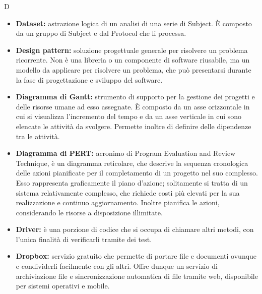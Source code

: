 \Huge D
\normalsize
\begin{itemize}
\item\textbf{Dataset:} astrazione logica di un analisi di una serie di Subject\glossario{}. È composto da un gruppo di Subject\glossario{} e dal Protocol\glossario{} che li processa.

\item \textbf{Design pattern:} soluzione progettuale generale per risolvere un problema ricorrente. Non è una libreria o un componente di software riusabile, ma un modello da applicare per risolvere un problema, che può presentarsi durante la fase di progettazione e sviluppo del software.

\item\textbf{Diagramma di Gantt:} strumento di supporto per la gestione dei progetti e delle risorse umane ad esso assegnate. \`E composto da un asse orizzontale in cui si visualizza l'incremento del tempo e da un asse verticale in cui sono elencate le attività da svolgere. Permette inoltre di definire delle dipendenze tra le attività.

\item \textbf{Diagramma di PERT:} acronimo di Program Evaluation and Review Technique, è un diagramma reticolare, che descrive la sequenza cronologica delle azioni pianificate per il completamento di un progetto nel suo complesso. Esso rappresenta graficamente il piano d’azione; solitamente si tratta di un sistema relativamente complesso, che richiede costi più elevati per la sua realizzazione e continuo aggiornamento. Inoltre pianifica le azioni, considerando le risorse a disposizione illimitate.

\item\textbf{Driver:} è una porzione di codice che si occupa di chiamare altri metodi, con l'unica finalità di verificarli tramite dei test.

\item \textbf{Dropbox:} servizio gratuito che permette di portare file e documenti ovunque e condividerli facilmente con gli altri. Offre dunque un servizio di archiviazione file e sincronizzazione automatica di file tramite web, disponibile per sistemi operativi e mobile.
\end{itemize}
\pagebreak


